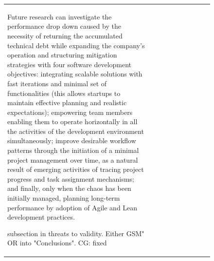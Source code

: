 \documentclass[12pt,journal,compsoc]{../sty/IEEEtran}
\begin{document}
\begin{table}[!t]
\begin{figure}[!t]
\begin{compactitem}
\begin{table}[!t]
\begin{tabular}{|l||c||c||c||c||c||c||c||c||c|}
Future research can investigate the performance drop down caused by the
necessity of returning the accumulated technical debt while expanding the
company's operation and structuring mitigation strategies with four software
development objectives: integrating scalable solutions with fast iterations and
minimal set of functionalities (this allows startups to maintain effective
planning and realistic expectations); empowering team members enabling them to
operate horizontally in all the activities of the development environment
simultaneously; improve desirable workflow patterns through the initiation of a
minimal project management over time, as a natural result of emerging activities
of tracing project progress and task assignment mechanisms; and finally, only
when the chaos has been initially managed, planning long-term performance by
adoption of Agile and Lean development practices.

subsection in threats to validity. Either  %
GSM" OR into "Conclusions". CG: fixed




\end{tabular}
\end{table}
\end{compactitem}
\end{figure}
\end{table}
\end{document}
